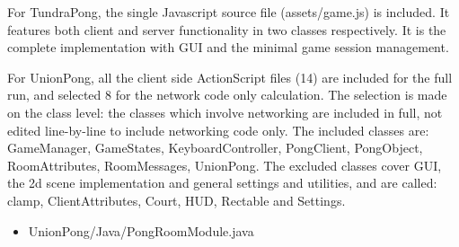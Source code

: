 \documentclass[conference]{IEEEtran}
\newlength{\DUtablewidth} %
\begin{document}
\setlength{\DUtablewidth}{\linewidth}

% 
% 
% 
% 
% 

For TundraPong, the single Javascript source file (assets/game.js) is
included. It features both client and server functionality in two
classes respectively. It is the complete implementation with GUI and
the minimal game session management.

For UnionPong, all the client side ActionScript files (14) are
included for the full run, and selected 8 for the network code only
calculation. The selection is made on the class level: the classes
which involve networking are included in full, not edited line-by-line
to include networking code only. The included classes are:
GameManager, GameStates, KeyboardController, PongClient, PongObject,
RoomAttributes, RoomMessages, UnionPong. The excluded classes cover
GUI, the 2d scene implementation and general settings and utilities,
and are called: clamp, ClientAttributes, Court, HUD, Rectable and
Settings.
%
\begin{itemize}

\item UnionPong/Java/PongRoomModule.java

\end{itemize}
\end{document}
